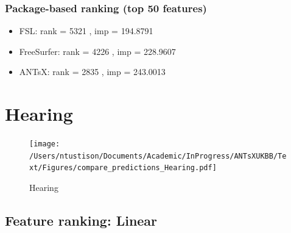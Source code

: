 \documentclass[
  10pt,
]{article}
\begin{document}
\hypertarget{package-based-ranking-top-50-features-6}{%
\subsubsection{Package-based ranking (top 50
features)}\label{package-based-ranking-top-50-features-6}}

\begin{itemize}
\item
  FSL: rank = 5321 , imp = 194.8791
\item
  FreeSurfer: rank = 4226 , imp = 228.9607
\item
  ANTsX: rank = 2835 , imp = 243.0013
\end{itemize}

\clearpage

\hypertarget{hearing}{%
\section{Hearing}\label{hearing}}

\begin{figure}
\centering
\texttt{[image: /Users/ntustison/Documents/Academic/InProgress/ANTsXUKBB/Text/Figures/compare\_predictions\_Hearing.pdf]}
\caption{Hearing}
\end{figure}

\hypertarget{feature-ranking-linear-7}{%
\subsection{Feature ranking: Linear}\label{feature-ranking-linear-7}}
\end{document}
